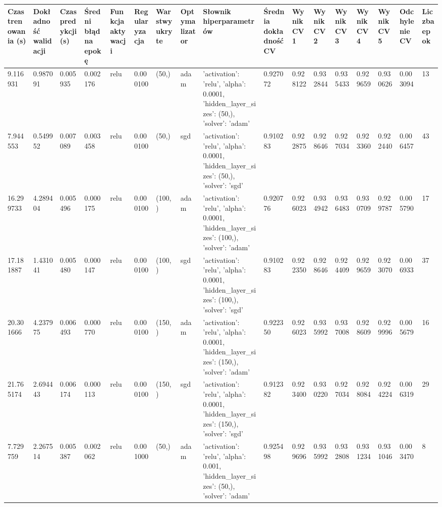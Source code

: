 \documentclass[a1paper]{article}  %
\begin{document}
	
\clearpage
{}
\fontsize{1pt}{2pt}
\begin{landscape}
	
	
	\begin{tabular}{lllllllllllllllll}
		\toprule
		Czas trenowania (s) & Dokładność walidacji & Czas predykcji (s) & Średni błąd na epokę & Funkcja aktywacji & Regularyzacja  & Warstwy ukryte & Optymalizator & Słownik hiperparametrów & Średnia dokładność CV & Wynik CV1 & Wynik CV2 & Wynik CV3 & Wynik CV4 & Wynik CV5 & Odchylenie CV & Liczba epok \\
		\midrule
		9.116931 & 0.987091 & 0.005935 & 0.002176 & relu & 0.000100 & (50,) & adam & {'activation': 'relu', 'alpha': 0.0001, 'hidden\_layer\_sizes': (50,), 'solver': 'adam'} & 0.927072 & 0.928122 & 0.932844 & 0.935433 & 0.929659 & 0.930626 & 0.003094 & 13 \\
		7.944553 & 0.549952 & 0.007089 & 0.003458 & relu & 0.000100 & (50,) & sgd & {'activation': 'relu', 'alpha': 0.0001, 'hidden\_layer\_sizes': (50,), 'solver': 'sgd'} & 0.910283 & 0.922875 & 0.928646 & 0.927034 & 0.923360 & 0.922440 & 0.006457 & 43 \\
		16.299733 & 4.289404 & 0.005496 & 0.000175 & relu & 0.000100 & (100,) & adam & {'activation': 'relu', 'alpha': 0.0001, 'hidden\_layer\_sizes': (100,), 'solver': 'adam'} & 0.920776 & 0.926023 & 0.934942 & 0.936483 & 0.930709 & 0.929787 & 0.005790 & 17 \\
		17.181887 & 1.431041 & 0.005480 & 0.000147 & relu & 0.000100 & (100,) & sgd & {'activation': 'relu', 'alpha': 0.0001, 'hidden\_layer\_sizes': (100,), 'solver': 'sgd'} & 0.910283 & 0.922350 & 0.928646 & 0.924409 & 0.929659 & 0.923070 & 0.006933 & 37 \\
		20.301666 & 4.237975 & 0.006493 & 0.000770 & relu & 0.000100 & (150,) & adam & {'activation': 'relu', 'alpha': 0.0001, 'hidden\_layer\_sizes': (150,), 'solver': 'adam'} & 0.922350 & 0.926023 & 0.935992 & 0.937008 & 0.928609 & 0.929996 & 0.005679 & 16 \\
		21.765174 & 2.694443 & 0.006174 & 0.000113 & relu & 0.000100 & (150,) & sgd & {'activation': 'relu', 'alpha': 0.0001, 'hidden\_layer\_sizes': (150,), 'solver': 'sgd'} & 0.912382 & 0.923400 & 0.930220 & 0.927034 & 0.928084 & 0.924224 & 0.006319 & 29 \\
		7.729759 & 2.267514 & 0.005387 & 0.002062 & relu & 0.001000 & (50,) & adam & {'activation': 'relu', 'alpha': 0.001, 'hidden\_layer\_sizes': (50,), 'solver': 'adam'} & 0.925498 & 0.929696 & 0.935992 & 0.932808 & 0.931234 & 0.931046 & 0.003470 & 8 \\

\end{tabular}
\end{landscape}
\end{document}
